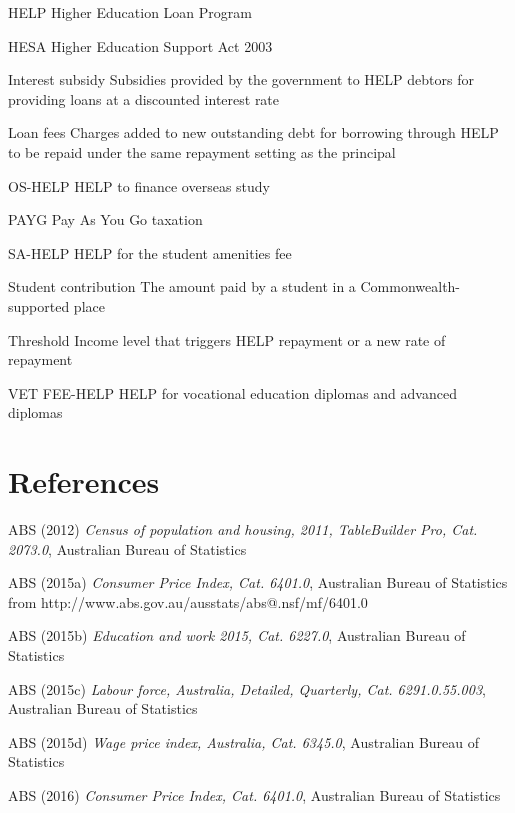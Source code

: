 \documentclass[]{book}
\begin{document}
HELP Higher Education Loan Program

HESA Higher Education Support Act 2003

Interest subsidy Subsidies provided by the government to HELP debtors for providing loans at a discounted interest rate

Loan fees Charges added to new outstanding debt for borrowing through HELP to be repaid under the same repayment setting as the principal

OS-HELP HELP to finance overseas study

PAYG Pay As You Go taxation

SA-HELP HELP for the student amenities fee

Student contribution The amount paid by a student in a Commonwealth-supported place

Threshold Income level that triggers HELP repayment or a new rate of repayment

VET FEE-HELP HELP for vocational education diplomas and advanced diplomas

\chapter{}\label{section-2}

\chapter{References}\label{references}

\protect\hypertarget{_ENREF_1}{}{}ABS (2012) \emph{Census of population and housing, 2011, TableBuilder Pro, Cat. 2073.0}, Australian Bureau of Statistics

\protect\hypertarget{_ENREF_2}{}{}ABS (2015a) \emph{Consumer Price Index, Cat. 6401.0}, Australian Bureau of Statistics from http://www.abs.gov.au/ausstats/abs@.nsf/mf/6401.0

\protect\hypertarget{_ENREF_3}{}{}ABS (2015b) \emph{Education and work 2015, Cat. 6227.0}, Australian Bureau of Statistics

\protect\hypertarget{_ENREF_4}{}{}ABS (2015c) \emph{Labour force, Australia, Detailed, Quarterly, Cat. 6291.0.55.003}, Australian Bureau of Statistics

\protect\hypertarget{_ENREF_5}{}{}ABS (2015d) \emph{Wage price index, Australia, Cat. 6345.0}, Australian Bureau of Statistics

\protect\hypertarget{_ENREF_6}{}{}ABS (2016) \emph{Consumer Price Index, Cat. 6401.0}, Australian Bureau of Statistics
\end{document}
